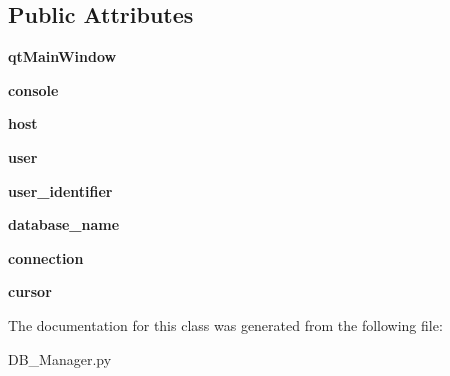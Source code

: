 \subsection*{Public Attributes}
\begin{DoxyCompactItemize}
\item 
\hypertarget{classDB__Manager_1_1DatabaseManager_af5c5fbb7f0ae4feb627c31cf15b39b30}{{\bfseries qt\-Main\-Window}}\label{classDB__Manager_1_1DatabaseManager_af5c5fbb7f0ae4feb627c31cf15b39b30}

\item 
\hypertarget{classDB__Manager_1_1DatabaseManager_a0029a0322d567089d5c28a23bc4687f1}{{\bfseries console}}\label{classDB__Manager_1_1DatabaseManager_a0029a0322d567089d5c28a23bc4687f1}

\item 
\hypertarget{classDB__Manager_1_1DatabaseManager_a498a03657a44fafdda73b629df5547e3}{{\bfseries host}}\label{classDB__Manager_1_1DatabaseManager_a498a03657a44fafdda73b629df5547e3}

\item 
\hypertarget{classDB__Manager_1_1DatabaseManager_a4fe3d3f9cebe928982255dacabd5f6e7}{{\bfseries user}}\label{classDB__Manager_1_1DatabaseManager_a4fe3d3f9cebe928982255dacabd5f6e7}

\item 
\hypertarget{classDB__Manager_1_1DatabaseManager_a713436be57ac1ad047a1cd415562342d}{{\bfseries user\-\_\-identifier}}\label{classDB__Manager_1_1DatabaseManager_a713436be57ac1ad047a1cd415562342d}

\item 
\hypertarget{classDB__Manager_1_1DatabaseManager_a0fbc8afad6ca0a2f5be6b4b07a2396f6}{{\bfseries database\-\_\-name}}\label{classDB__Manager_1_1DatabaseManager_a0fbc8afad6ca0a2f5be6b4b07a2396f6}

\item 
\hypertarget{classDB__Manager_1_1DatabaseManager_a39178b225b3bbf4f0110e1548ea2f5ee}{{\bfseries connection}}\label{classDB__Manager_1_1DatabaseManager_a39178b225b3bbf4f0110e1548ea2f5ee}

\item 
\hypertarget{classDB__Manager_1_1DatabaseManager_a192c0591348c6df3dbe137f5439a64a2}{{\bfseries cursor}}\label{classDB__Manager_1_1DatabaseManager_a192c0591348c6df3dbe137f5439a64a2}

\end{DoxyCompactItemize}


The documentation for this class was generated from the following file\-:\begin{DoxyCompactItemize}
\item 
D\-B\-\_\-\-Manager.\-py\end{DoxyCompactItemize}
